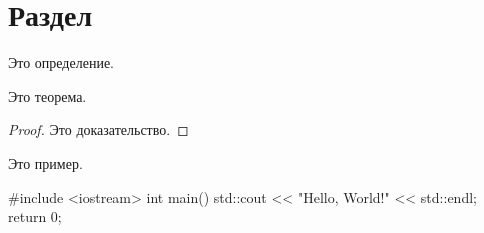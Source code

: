 
  
\lecturedate{\today}

\section{Раздел}
\begin{definition}
Это определение.
\end{definition}
\begin{theorem}
Это теорема.
\end{theorem}
\begin{proof}
Это доказательство.
\end{proof}
\begin{example}
Это пример.
\end{example}
\begin{cpp}
#include <iostream>
int main() {
    std::cout << "Hello, World!" << std::endl;
    return 0;
}
\end{cpp}


